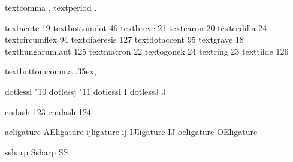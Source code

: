 

\startencoding[default]

 textcomma         ,
 textperiod        .

 textacute         19
 textbottomdot     46
 textbreve         21
 textcaron         20
 textcedilla       24
 textcircumflex    94
 textdiaeresis    127
 textdotaccent     95
 textgrave         18
 texthungarumlaut 125
 textmacron        22
 textogonek        24 %
 textring          23
 texttilde        126

 textbottomcomma  {\hbox{\lower.35ex\hbox{\tx,}}} %

 dotlessi         {\char"10 }
 dotlessj         {\char"11 }
 dotlessI         {I}
 dotlessJ         {J}

 endash           123
 emdash           124

 aeligature       { } %
 AEligature       { } %
 ijligature       {ij}
 IJligature       {IJ}
 oeligature       { } %
 OEligature       { } %

 ssharp           { } %
 Ssharp           {SS}

